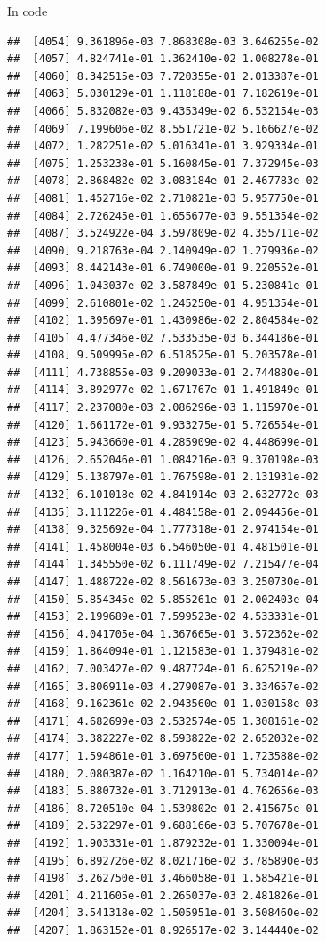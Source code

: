 \documentclass[ignorenonframetext,]{beamer}
\begin{document}
\begin{frame}[fragile]{In code}
\begin{verbatim}
##  [4054] 9.361896e-03 7.868308e-03 3.646255e-02
##  [4057] 4.824741e-01 1.362410e-02 1.008278e-01
##  [4060] 8.342515e-03 7.720355e-01 2.013387e-01
##  [4063] 5.030129e-01 1.118188e-01 7.182619e-01
##  [4066] 5.832082e-03 9.435349e-02 6.532154e-03
##  [4069] 7.199606e-02 8.551721e-02 5.166627e-02
##  [4072] 1.282251e-02 5.016341e-01 3.929334e-01
##  [4075] 1.253238e-01 5.160845e-01 7.372945e-03
##  [4078] 2.868482e-02 3.083184e-01 2.467783e-02
##  [4081] 1.452716e-02 2.710821e-03 5.957750e-01
##  [4084] 2.726245e-01 1.655677e-03 9.551354e-02
##  [4087] 3.524922e-04 3.597809e-02 4.355711e-02
##  [4090] 9.218763e-04 2.140949e-02 1.279936e-02
##  [4093] 8.442143e-01 6.749000e-01 9.220552e-01
##  [4096] 1.043037e-02 3.587849e-01 5.230841e-01
##  [4099] 2.610801e-02 1.245250e-01 4.951354e-01
##  [4102] 1.395697e-01 1.430986e-02 2.804584e-02
##  [4105] 4.477346e-02 7.533535e-03 6.344186e-01
##  [4108] 9.509995e-02 6.518525e-01 5.203578e-01
##  [4111] 4.738855e-03 9.209033e-01 2.744880e-01
##  [4114] 3.892977e-02 1.671767e-01 1.491849e-01
##  [4117] 2.237080e-03 2.086296e-03 1.115970e-01
##  [4120] 1.661172e-01 9.933275e-01 5.726554e-01
##  [4123] 5.943660e-01 4.285909e-02 4.448699e-01
##  [4126] 2.652046e-01 1.084216e-03 9.370198e-03
##  [4129] 5.138797e-01 1.767598e-01 2.131931e-02
##  [4132] 6.101018e-02 4.841914e-03 2.632772e-03
##  [4135] 3.111226e-01 4.484158e-01 2.094456e-01
##  [4138] 9.325692e-04 1.777318e-01 2.974154e-01
##  [4141] 1.458004e-03 6.546050e-01 4.481501e-01
##  [4144] 1.345550e-02 6.111749e-02 7.215477e-04
##  [4147] 1.488722e-02 8.561673e-03 3.250730e-01
##  [4150] 5.854345e-02 5.855261e-01 2.002403e-04
##  [4153] 2.199689e-01 7.599523e-02 4.533331e-01
##  [4156] 4.041705e-04 1.367665e-01 3.572362e-02
##  [4159] 1.864094e-01 1.121583e-01 1.379481e-02
##  [4162] 7.003427e-02 9.487724e-01 6.625219e-02
##  [4165] 3.806911e-03 4.279087e-01 3.334657e-02
##  [4168] 9.162361e-02 2.943560e-01 1.030158e-03
##  [4171] 4.682699e-03 2.532574e-05 1.308161e-02
##  [4174] 3.382227e-02 8.593822e-02 2.652032e-02
##  [4177] 1.594861e-01 3.697560e-01 1.723588e-02
##  [4180] 2.080387e-02 1.164210e-01 5.734014e-02
##  [4183] 5.880732e-01 3.712913e-01 4.762656e-03
##  [4186] 8.720510e-04 1.539802e-01 2.415675e-01
##  [4189] 2.532297e-01 9.688166e-03 5.707678e-01
##  [4192] 1.903331e-01 1.879232e-01 1.330094e-01
##  [4195] 6.892726e-02 8.021716e-02 3.785890e-03
##  [4198] 3.262750e-01 3.466058e-01 1.585421e-01
##  [4201] 4.211605e-01 2.265037e-03 2.481826e-01
##  [4204] 3.541318e-02 1.505951e-01 3.508460e-02
##  [4207] 1.863152e-01 8.926517e-02 3.144440e-02

\end{verbatim}
\end{frame}
\end{document}
